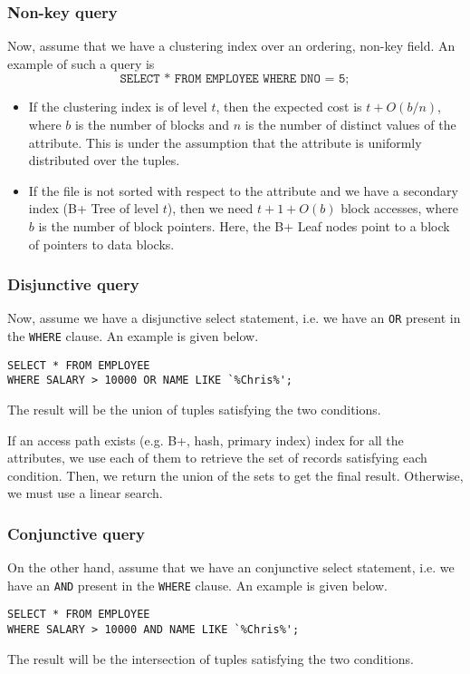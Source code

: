 \documentclass[a4paper, openany]{memoir}
\theoremstyle{definition}
\theoremstyle{plain}
\begin{document}
\subsubsection{Non-key query}
Now, assume that we have a clustering index over an ordering, non-key field. An example of such a query is
\[\texttt{SELECT * FROM EMPLOYEE WHERE DNO = 5};\]
\begin{itemize}
    \item If the clustering index is of level $t$, then the expected cost is $t + O(b/n)$, where $b$ is the number of blocks and $n$ is the number of distinct values of the attribute. This is under the assumption that the attribute is uniformly distributed over the tuples.
    \item If the file is not sorted with respect to the attribute and we have a secondary index (B+ Tree of level $t$), then we need $t + 1 + O(b)$ block accesses, where $b$ is the number of block pointers. Here, the B+ Leaf nodes point to a block of pointers to data blocks.
\end{itemize}

\subsubsection{Disjunctive query}
Now, assume we have a disjunctive select statement, i.e. we have an \texttt{OR} present in the \texttt{WHERE} clause. An example is given below.
\begin{verbatim}
SELECT * FROM EMPLOYEE 
WHERE SALARY > 10000 OR NAME LIKE `%Chris%';
\end{verbatim}
The result will be the union of tuples satisfying the two conditions. 

If an access path exists (e.g. B+, hash, primary index) index for all the attributes, we use each of them to retrieve the set of records satisfying each condition. Then, we return the union of the sets to get the final result. Otherwise, we must use a linear search.

\subsubsection{Conjunctive query}
On the other hand, assume that we have an conjunctive select statement, i.e. we have an \texttt{AND} present in the \texttt{WHERE} clause. An example is given below.
\begin{verbatim}
SELECT * FROM EMPLOYEE 
WHERE SALARY > 10000 AND NAME LIKE `%Chris%';
\end{verbatim}
The result will be the intersection of tuples satisfying the two conditions. 
\end{document}
